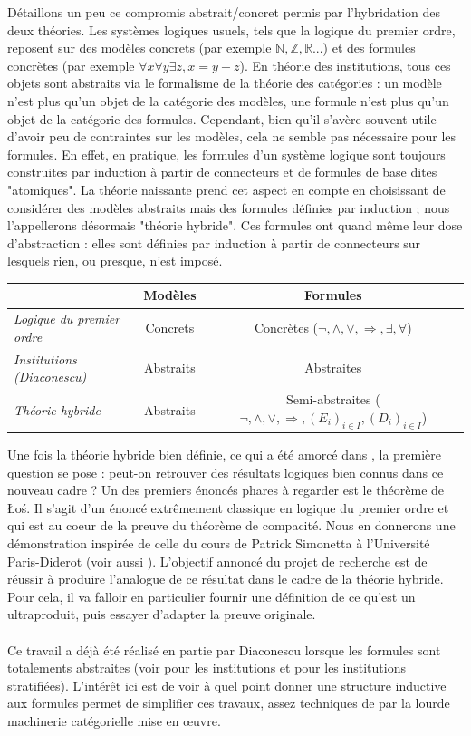 \documentclass[11pt,a4paper]{report}
\newcommand{\gr}{\textbf}
\newcommand{\il}{\textit}
\newcommand{\1}{\mathbbm{1}}
\begin{document}
Détaillons un peu ce compromis abstrait/concret permis par l'hybridation des deux théories. Les systèmes logiques usuels, tels que la logique du premier ordre, reposent sur des modèles concrets (par exemple $\mathbb{N},\mathbb{Z},\mathbb{R}$...) et des formules concrètes (par exemple $\forall x \forall y \exists z, x = y + z$). En théorie des institutions, tous ces objets sont abstraits via le formalisme de la théorie des catégories : un modèle n'est plus qu'un objet de la catégorie des modèles, une formule n'est plus qu'un objet de la catégorie des formules. Cependant, bien qu'il s'avère souvent utile d'avoir peu de contraintes sur les modèles, cela ne semble pas nécessaire pour les formules. En effet, en pratique, les formules d'un système logique sont toujours construites par induction à partir de connecteurs et de formules de base dites "atomiques". La théorie naissante prend cet aspect en compte en choisissant de considérer des modèles abstraits mais des formules définies par induction ; nous l'appellerons désormais "théorie hybride". Ces formules ont quand même leur dose d'abstraction : elles sont définies par induction à partir de connecteurs sur lesquels rien, ou presque, n'est imposé.

\begin{center}
\begin{tabular}{|l|c|c|}
  \hline
   & \gr{Modèles} & \gr{Formules} \\
  \hline
  \il{Logique du premier ordre} & Concrets & Concrètes ($\neg,\wedge,\vee,\Rightarrow,\exists,\forall$)\\
  \hline
  \il{Institutions (Diaconescu)} & Abstraits & Abstraites \\
  \hline
  \il{Théorie hybride} & Abstraits & Semi-abstraites ($\neg,\wedge,\vee,\Rightarrow,(E_i)_{i\in I},(D_i)_{i\in I}$) \\
  \hline
\end{tabular}
\end{center}

Une fois la théorie hybride bien définie, ce qui a été amorcé dans \cite{Aig17}, la première question se pose : peut-on retrouver des résultats logiques bien connus dans ce nouveau cadre ? Un des premiers énoncés phares à regarder est le théorème de \L o\'s. Il s'agit d'un énoncé extrêmement classique en logique du premier ordre et qui est au coeur de la preuve du théorème de compacité. Nous en donnerons une démonstration inspirée de celle du cours de Patrick Simonetta à l'Université Paris-Diderot (voir aussi \cite{Cor03}). L'objectif annoncé du projet de recherche est de réussir à produire l'analogue de ce résultat dans le cadre de la théorie hybride. Pour cela, il va falloir en particulier fournir une définition de ce qu'est un ultraproduit, puis essayer d'adapter la preuve originale.\\\\
Ce travail a déjà été réalisé en partie par Diaconescu lorsque les formules sont totalements abstraites (voir \cite{Dia08} pour les institutions et \cite{Dia16} pour les institutions stratifiées). L'intérêt ici est de voir à quel point donner une structure inductive aux formules permet de simplifier ces travaux, assez techniques de par la lourde machinerie catégorielle mise en \oe uvre.
\end{document}
